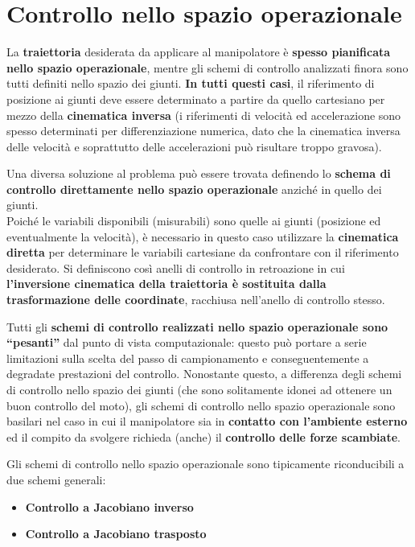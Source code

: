 \section{Controllo nello spazio operazionale}
La \textbf{traiettoria} desiderata da applicare al manipolatore è \textbf{spesso pianificata nello spazio operazionale}, mentre gli schemi di controllo analizzati finora sono tutti definiti nello spazio dei giunti.
\textbf{In tutti questi casi}, il riferimento di posizione ai giunti deve essere determinato a partire da quello cartesiano per mezzo della \textbf{cinematica inversa} (i riferimenti di velocità ed accelerazione sono spesso determinati per differenziazione numerica, dato che la cinematica inversa delle velocità e soprattutto delle accelerazioni può risultare troppo gravosa).

Una diversa soluzione al problema può essere trovata definendo lo \textbf{schema di controllo direttamente nello spazio operazionale} anziché in quello dei giunti. \\
Poiché le variabili disponibili (misurabili) sono quelle ai giunti (posizione ed eventualmente la velocità), è necessario in questo caso utilizzare la \textbf{cinematica diretta} per determinare le variabili cartesiane da confrontare con il riferimento desiderato. Si definiscono così anelli di controllo in retroazione in cui \textbf{l’inversione cinematica della traiettoria è sostituita dalla trasformazione delle coordinate}, racchiusa nell’anello di controllo stesso.

Tutti gli \textbf{schemi di controllo realizzati nello spazio operazionale sono “pesanti”} dal punto di vista computazionale: questo può portare a serie limitazioni sulla scelta del passo di campionamento e conseguentemente a degradate prestazioni del controllo. Nonostante questo, a differenza degli schemi di controllo nello spazio dei giunti (che sono solitamente idonei ad ottenere un buon controllo del moto), gli schemi di controllo nello spazio operazionale sono basilari nel caso in cui il manipolatore sia in \textbf{contatto con l’ambiente esterno} ed il compito da svolgere richieda (anche) il \textbf{controllo delle forze scambiate}.

Gli schemi di controllo nello spazio operazionale sono tipicamente riconducibili a due schemi generali:
\begin{itemize}
	\item \textbf{Controllo a Jacobiano inverso}
	\item \textbf{Controllo a Jacobiano trasposto}
\end{itemize}

